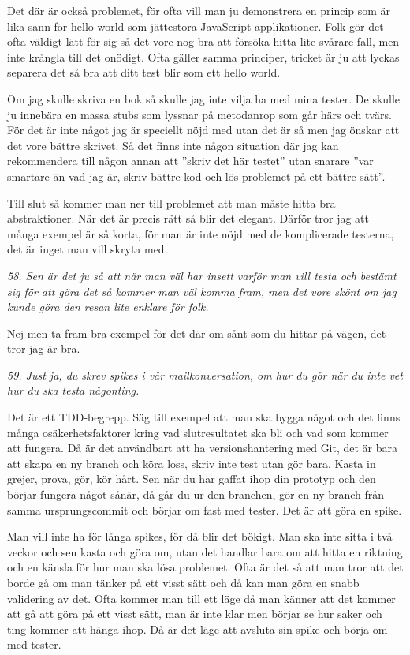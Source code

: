 \documentclass[11pt]{article}
\begin{document}
Det där är också problemet, för ofta vill man ju demonstrera en princip som är lika sann för hello world som jättestora JavaScript-applikationer. Folk gör det ofta väldigt lätt för sig så det vore nog bra att försöka hitta lite svårare fall, men inte krångla till det onödigt. Ofta gäller samma principer, tricket är ju att lyckas separera det så bra att ditt test blir som ett hello world.

Om jag skulle skriva en bok så skulle jag inte vilja ha med mina tester. De skulle ju innebära en massa stubs som lyssnar på metodanrop som går härs och tvärs. För det är inte något jag är speciellt nöjd med utan det är så men jag önskar att det vore bättre skrivet. Så det finns inte någon situation där jag kan rekommendera till någon annan att ”skriv det här testet” utan snarare ”var smartare än vad jag är, skriv bättre kod och lös problemet på ett bättre sätt”.

Till slut så kommer man ner till problemet att man måste hitta bra abstraktioner. När det är precis rätt så blir det elegant. Därför tror jag att många exempel är så korta, för man är inte nöjd med de komplicerade testerna, det är inget man vill skryta med.

\emph{58. Sen är det ju så att när man väl har insett varför man vill testa och bestämt sig för att göra det så kommer man väl komma fram, men det vore skönt om jag kunde göra den resan lite enklare för folk.}

Nej men ta fram bra exempel för det där om sånt som du hittar på vägen, det tror jag är bra.

\emph{59. Just ja, du skrev spikes i vår mailkonversation, om hur du gör när du inte vet hur du ska testa någonting.}

Det är ett TDD-begrepp. Säg till exempel att man ska bygga något och det finns många osäkerhetsfaktorer kring vad slutresultatet ska bli och vad som kommer att fungera. Då är det användbart att ha versionshantering med Git, det är bara att skapa en ny branch och köra loss, skriv inte test utan gör bara. Kasta in grejer, prova, gör, kör hårt. Sen när du har gaffat ihop din prototyp och den börjar fungera något sånär, då går du ur den branchen, gör en ny branch från samma ursprungscommit och börjar om fast med tester. Det är att göra en spike.

Man vill inte ha för långa spikes, för då blir det bökigt. Man ska inte sitta i två veckor och sen kasta och göra om, utan det handlar bara om att hitta en riktning och en känsla för hur man ska lösa problemet. Ofta är det så att man tror att det borde gå om man tänker på ett visst sätt och då kan man göra en snabb validering av det. Ofta kommer man till ett läge då man känner att det kommer att gå att göra på ett visst sätt, man är inte klar men börjar se hur saker och ting kommer att hänga ihop. Då är det läge att avsluta sin spike och börja om med tester.
\end{document}
